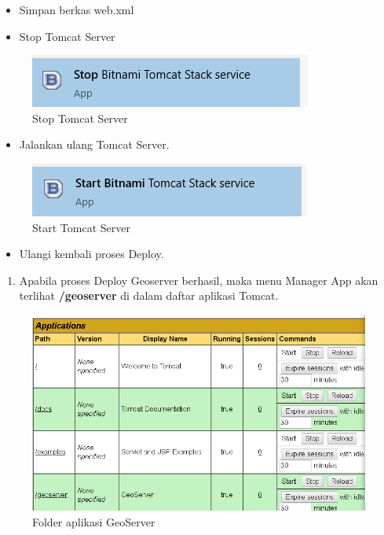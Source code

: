 \documentclass[]{book}
\providecommand{\tightlist}{%
  \setlength{\itemsep}{0pt}\setlength{\parskip}{0pt}}
\begin{document}
\begin{itemize}
\item
  Simpan berkas web.xml
\item
  Stop Tomcat Server
\end{itemize}

\begin{figure}

{\centering \includegraphics[width=0.4\linewidth]{images/08/gs111} 

}

\caption{Stop Tomcat Server}\label{fig:fig111}
\end{figure}

\begin{itemize}
\tightlist
\item
  Jalankan ulang Tomcat Server.
\end{itemize}

\begin{figure}

{\centering \includegraphics[width=0.4\linewidth]{images/08/gs112} 

}

\caption{Start Tomcat Server}\label{fig:fig112}
\end{figure}

\begin{itemize}
\tightlist
\item
  Ulangi kembali proses Deploy.
\end{itemize}

\begin{enumerate}
\def\labelenumi{\arabic{enumi}.}
\setcounter{enumi}{4}
\tightlist
\item
  Apabila proses Deploy Geoserver berhasil, maka menu Manager App akan terlihat \textbf{/geoserver} di dalam daftar aplikasi Tomcat.
\end{enumerate}

\begin{figure}

{\centering \includegraphics[width=0.4\linewidth]{images/08/gs39} 

}

\caption{Folder aplikasi GeoServer}\label{fig:fig39}
\end{figure}
\end{document}
